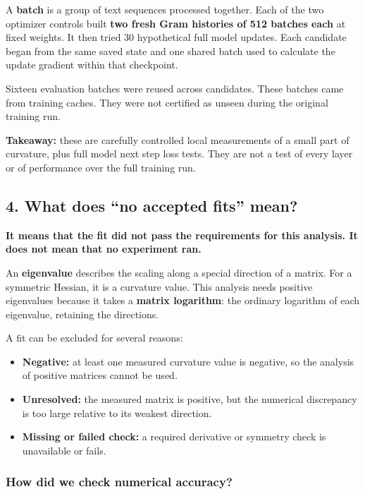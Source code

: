 \documentclass[
  14pt,
  letterpaper,
]{extarticle}
\providecommand{\tightlist}{%
  \setlength{\itemsep}{0pt}\setlength{\parskip}{0pt}}
\let\reportsubsubsection\subsubsection
\renewcommand{\subsubsection}{\Needspace{5\baselineskip}\reportsubsubsection}
\begin{document}
A \textbf{batch} is a group of text sequences processed together. Each
of the two optimizer controls built \textbf{two fresh Gram histories of
512 batches each} at fixed weights. It then tried 30 hypothetical full
model updates. Each candidate began from the same saved state and one
shared batch used to calculate the update gradient within that
checkpoint.

Sixteen evaluation batches were reused across candidates. These batches
came from training caches. They were not certified as unseen during the
original training run.

\textbf{Takeaway:} these are carefully controlled local measurements of
a small part of curvature, plus full model next step loss tests. They
are not a test of every layer or of performance over the full training
run.


\subsection{4. What does ``no accepted fits''
mean?}\label{what-does-no-accepted-fits-mean}

\textbf{It means that the fit did not pass the requirements for this
analysis. It does not mean that no experiment ran.}

An \textbf{eigenvalue} describes the scaling along a special direction
of a matrix. For a symmetric Hessian, it is a curvature value. This
analysis needs positive eigenvalues because it takes a \textbf{matrix
logarithm}: the ordinary logarithm of each eigenvalue, retaining the
directions.

A fit can be excluded for several reasons:

\begin{itemize}
\tightlist
\item
  \textbf{Negative:} at least one measured curvature value is negative,
  so the analysis of positive matrices cannot be used.
\item
  \textbf{Unresolved:} the measured matrix is positive, but the
  numerical discrepancy is too large relative to its weakest direction.
\item
  \textbf{Missing or failed check:} a required derivative or symmetry
  check is unavailable or fails.
\end{itemize}

\subsubsection{How did we check numerical
accuracy?}\label{how-did-we-check-numerical-accuracy}
\end{document}
